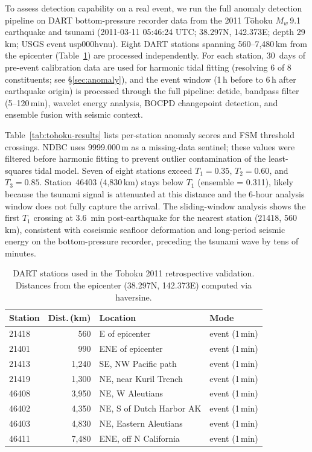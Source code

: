 \documentclass{article}
\begin{document}
To assess detection capability on a real event, we run the full anomaly
detection pipeline on DART bottom-pressure recorder data from the 2011
T\={o}hoku $M_w$\,9.1 earthquake and tsunami
(2011-03-11 05:46:24 UTC; 38.297\textdegree N, 142.373\textdegree E;
depth 29\,km; USGS event usp000hvnu).
Eight DART stations spanning 560--7{,}480\,km from the epicenter
(Table~\ref{tab:tohoku-stations}) are processed independently.
For each station, 30~days of pre-event calibration data are used for
harmonic tidal fitting (resolving 6 of 8 constituents; see \S\ref{sec:anomaly}),
and the event window (1\,h before to 6\,h after earthquake origin) is
processed through the full pipeline: detide, bandpass filter
(5--120\,min), wavelet energy analysis, BOCPD changepoint detection,
and ensemble fusion with seismic context.

Table~\ref{tab:tohoku-results} lists per-station anomaly scores and
FSM threshold crossings.  NDBC uses 9999.000\,m as a missing-data
sentinel; these values were filtered before harmonic fitting to prevent
outlier contamination of the least-squares tidal model.
Seven of eight stations exceed $T_1 = 0.35$, $T_2 = 0.60$, and
$T_3 = 0.85$.  Station~46403 (4{,}830\,km) stays below $T_1$
(ensemble = 0.311), likely because the tsunami signal is attenuated
at this distance and the 6-hour analysis window does not fully
capture the arrival.
The sliding-window analysis shows the first $T_1$ crossing at 3.6~min
post-earthquake for the nearest station (21418, 560\,km), consistent
with coseismic seafloor deformation and long-period seismic energy
on the bottom-pressure recorder, preceding the tsunami wave by tens
of minutes.

\begin{table}[!htb]
\centering
\caption{DART stations used in the Tohoku 2011 retrospective validation.
  Distances from the epicenter (38.297\textdegree N, 142.373\textdegree E)
  computed via haversine.}
\label{tab:tohoku-stations}
\small
\begin{tabular}{lrll}
\toprule
\textbf{Station} & \textbf{Dist.\,(km)} & \textbf{Location} & \textbf{Mode} \\
\midrule
21418 & 560    & E of epicenter           & event (1\,min) \\
21401 & 990    & ENE of epicenter         & event (1\,min) \\
21413 & 1{,}240  & SE, NW Pacific path      & event (1\,min) \\
21419 & 1{,}300  & NE, near Kuril Trench    & event (1\,min) \\
46408 & 3{,}950  & NE, W Aleutians          & event (1\,min) \\
46402 & 4{,}350  & NE, S of Dutch Harbor AK & event (1\,min) \\
46403 & 4{,}830  & NE, Eastern Aleutians    & event (1\,min) \\
46411 & 7{,}480  & ENE, off N California    & event (1\,min) \\
\bottomrule
\end{tabular}
\end{table}
\end{document}
